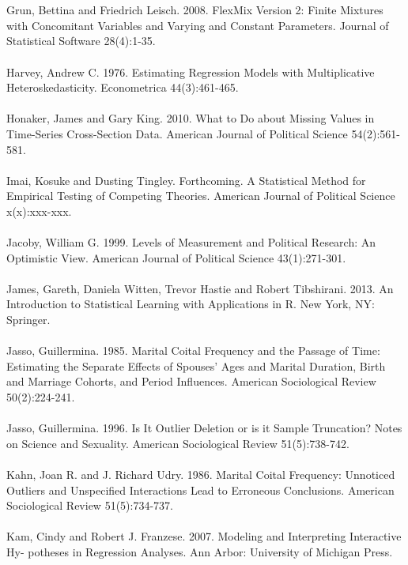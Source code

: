 \documentclass[letterpaper]{article}
\begin{document}
\\
\\
Grun, Bettina and Friedrich Leisch. 2008. FlexMix Version 2: Finite Mixtures with Concomitant Variables and Varying and Constant Parameters. Journal of Statistical Software 28(4):1-35.
\\
\\
Harvey, Andrew C. 1976. Estimating Regression Models with Multiplicative Heteroskedasticity. Econometrica 44(3):461-465.
\\
\\
Honaker, James and Gary King. 2010. What to Do about Missing Values in Time-Series Cross-Section Data. American Journal of Political Science 54(2):561-581.
\\
\\
Imai, Kosuke and Dusting Tingley. Forthcoming. A Statistical Method for Empirical Testing of Competing Theories. American Journal of Political Science x(x):xxx-xxx.
\\
\\
Jacoby, William G. 1999. Levels of Measurement and Political Research: An Optimistic View. American Journal of Political Science 43(1):271-301.
\\
\\
James, Gareth, Daniela Witten, Trevor Hastie and Robert Tibshirani. 2013. An Introduction to Statistical Learning with Applications in R. New York, NY: Springer.
\\
\\
Jasso, Guillermina. 1985. Marital Coital Frequency and the Passage of Time: Estimating the Separate Effects of Spouses' Ages and Marital Duration, Birth and Marriage Cohorts, and Period Influences. American Sociological Review 50(2):224-241.
\\
\\
Jasso, Guillermina. 1996. Is It Outlier Deletion or is it Sample Truncation? Notes on Science and Sexuality. American Sociological Review 51(5):738-742.
\\
\\
Kahn, Joan R. and J. Richard Udry. 1986. Marital Coital Frequency: Unnoticed Outliers and Unspecified Interactions Lead to Erroneous Conclusions. American Sociological Review 51(5):734-737.
\\
\\
Kam, Cindy and Robert J. Franzese. 2007. Modeling and Interpreting Interactive Hy- potheses in Regression Analyses. Ann Arbor: University of Michigan Press.
\\
\\
\end{document}
